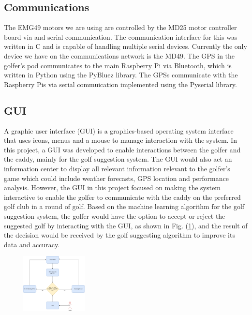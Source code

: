 \documentclass[11pt,landscape]{article}
\begin{document}
\begin{multicols}{3}

\subsection{Communications}
The EMG49 motors we are using are controlled by the MD25 motor controller board
via and serial communication. The communication interface for this was written in C
and is capable of handling multiple serial devices. Currently the only device we
have on the communications network is the MD49. The GPS in the golfer's pod
communicates to the main Raspberry Pi via Bluetooth, which is written in Python
using the PyBluez library. The GPSs communicate with the Raspberry Pis via
serial commuication implemented using the Pyserial library.


\subsection{GUI}

A graphic user interface (GUI) is a graphics-based operating system interface
that uses icons, menus and a mouse to manage interaction with the system. In
this project, a GUI was developed to enable interactions between the golfer and
the caddy, mainly for the golf suggestion system. The GUI would also act an
information center to display all relevant information relevant to the golfer’s
game which could include weather forecasts, GPS location and performance
analysis. However, the GUI in this project focused on making the system
interactive to enable the golfer to communicate with the caddy on the preferred
golf club in a round of golf. Based on the machine learning algorithm for the
golf suggestion system, the golfer would have the option to accept or reject the
suggested golf by interacting with the GUI, as shown in Fig. (\ref{fig:gui}),
and the result of the decision would be received by the golf suggesting
algorithm to improve its data and accuracy. 

\begin{figure}[H]
    \begin{center}
        \includegraphics[width=0.3\textwidth]{GUI.png}
    \end{center}
    \label{fig:gui}
\end{figure}


\end{multicols}
\end{document}
